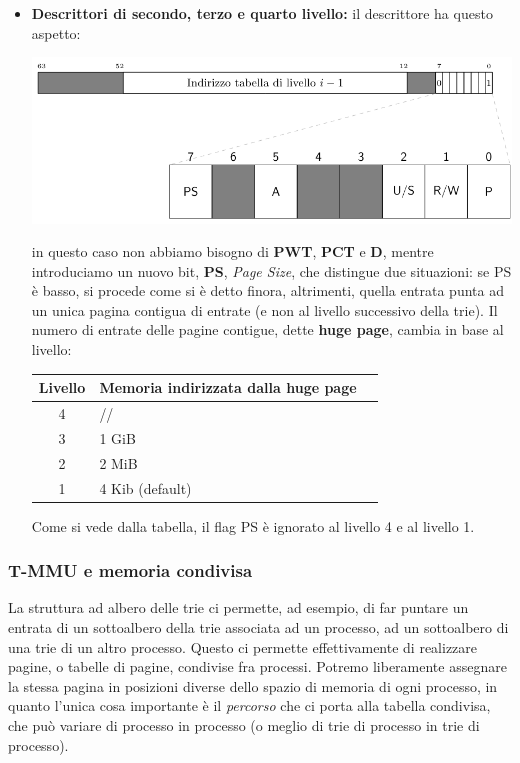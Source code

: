 \documentclass[a4paper,11pt]{article}
\begin{document}
\begin{itemize}
	\item \textbf{Descrittori di secondo, terzo e quarto livello:} il descrittore ha questo aspetto:
\begin{center}
	\includegraphics[scale=0.6]{../figures/mmu_level234.png}
\end{center}
		in questo caso non abbiamo bisogno di \textbf{PWT}, \textbf{PCT} e \textbf{D}, mentre introduciamo un nuovo bit, \textbf{PS}, \textit{Page Size}, che distingue due situazioni: se PS è basso, si procede come si è detto finora, altrimenti, quella entrata punta ad un unica pagina contigua di entrate (e non al livello successivo della trie).
		Il numero di entrate delle pagine contigue, dette \textbf{huge page}, cambia in base al livello:
\begin{table}[H]
	\center {}
	\begin{tabular} { c | p{6cm} | p{6cm} }
		\bfseries Livello & \bfseries Memoria indirizzata dalla huge page\\ 
		\hline 
		4 & // \\ 
		3 & 1 GiB \\ 
		2 & 2 MiB \\ 
		1 & 4 Kib (default) \\
	\end{tabular}
\end{table}

Come si vede dalla tabella, il flag PS è ignorato al livello 4 e al livello 1.
\end{itemize}

\subsubsection{T-MMU e memoria condivisa}
La struttura ad albero delle trie ci permette, ad esempio, di far puntare un entrata di un sottoalbero della trie associata ad un processo, ad un sottoalbero di una trie di un altro processo.
Questo ci permette effettivamente di realizzare pagine, o tabelle di pagine, condivise fra processi.
Potremo liberamente assegnare la stessa pagina in posizioni diverse dello spazio di memoria di ogni processo, in quanto l'unica cosa importante è il \textit{percorso} che ci porta alla tabella condivisa, che può variare di processo in processo (o meglio di trie di processo in trie di processo).
\end{document}
